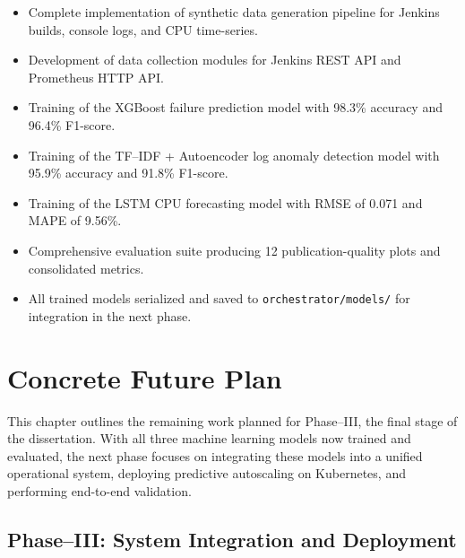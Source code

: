 \documentclass[12pt]{report}
\begin{document}
\begin{itemize}
    \item Complete implementation of synthetic data generation pipeline for Jenkins builds, console logs, and CPU time-series.
    \item Development of data collection modules for Jenkins REST API and Prometheus HTTP API.
    \item Training of the XGBoost failure prediction model with 98.3\% accuracy and 96.4\% F1-score.
    \item Training of the TF--IDF + Autoencoder log anomaly detection model with 95.9\% accuracy and 91.8\% F1-score.
    \item Training of the LSTM CPU forecasting model with RMSE of 0.071 and MAPE of 9.56\%.
    \item Comprehensive evaluation suite producing 12 publication-quality plots and consolidated metrics.
    \item All trained models serialized and saved to \texttt{orchestrator/models/} for integration in the next phase.
\end{itemize}



\clearpage
\chapter{Concrete Future Plan}

This chapter outlines the remaining work planned for Phase--III, the final stage of the dissertation. With all three machine learning models now trained and evaluated, the next phase focuses on integrating these models into a unified operational system, deploying predictive autoscaling on Kubernetes, and performing end-to-end validation.

\section{Phase--III: System Integration and Deployment}
\end{document}
